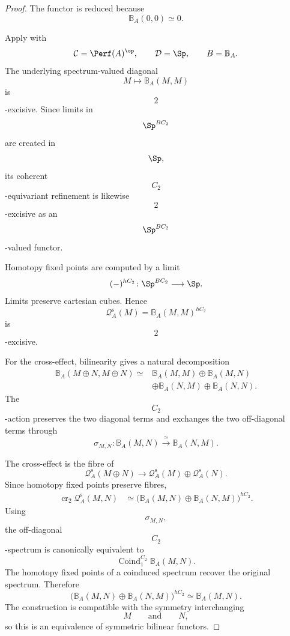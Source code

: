 \begin{proof}
The functor is reduced because
\[
    \mathbb B_A(0,0)
    \simeq
    0.
\]

Apply
with
\[
    \mathcal C
    =
    \Perf(A)^{\op},
    \qquad
    \mathcal D
    =
    \Sp,
    \qquad
    B
    =
    \mathbb B_A.
\]
The underlying spectrum-valued diagonal
\[
    M
    \longmapsto
    \mathbb B_A(M,M)
\]
is
\[
    2
\]
-excisive. Since limits in
\[
    \Sp^{BC_2}
\]
are created in
\[
    \Sp,
\]
its coherent
\[
    C_2
\]
-equivariant refinement is likewise
\[
    2
\]
-excisive as an
\[
    \Sp^{BC_2}
\]
-valued functor.

Homotopy fixed points are computed by a limit
\[
    (-)^{hC_2}
    \colon
    \Sp^{BC_2}
    \longrightarrow
    \Sp.
\]
Limits preserve cartesian cubes. Hence
\[
    \mathcal Q_A^{\mathrm s}(M)
    =
    \mathbb B_A(M,M)^{hC_2}
\]
is
\[
    2
\]
-excisive.

For the cross-effect, bilinearity gives a natural decomposition
\[
\begin{aligned}
    \mathbb B_A(M\oplus N,M\oplus N)
    \simeq{}&
    \mathbb B_A(M,M)
    \oplus
    \mathbb B_A(M,N)
    \\
    &\oplus
    \mathbb B_A(N,M)
    \oplus
    \mathbb B_A(N,N).
\end{aligned}
\]
The
\[
    C_2
\]
-action preserves the two diagonal terms and exchanges the two
off-diagonal terms through
\[
    \sigma_{M,N}
    \colon
    \mathbb B_A(M,N)
    \xrightarrow{\;\simeq\;}
    \mathbb B_A(N,M).
\]

The cross-effect is the fibre of
\[
    \mathcal Q_A^{\mathrm s}(M\oplus N)
    \longrightarrow
    \mathcal Q_A^{\mathrm s}(M)
    \oplus
    \mathcal Q_A^{\mathrm s}(N).
\]
Since homotopy fixed points preserve fibres,
\[
\begin{aligned}
    \operatorname{cr}_2
    \mathcal Q_A^{\mathrm s}(M,N)
    &\simeq
    \bigl(
        \mathbb B_A(M,N)
        \oplus
        \mathbb B_A(N,M)
    \bigr)^{hC_2}.
\end{aligned}
\]
Using
\[
    \sigma_{M,N},
\]
the off-diagonal
\[
    C_2
\]
-spectrum is canonically equivalent to
\[
    \operatorname{Coind}_{1}^{C_2}
    \mathbb B_A(M,N).
\]
The homotopy fixed points of a coinduced spectrum recover the original
spectrum. Therefore
\[
    \bigl(
        \mathbb B_A(M,N)
        \oplus
        \mathbb B_A(N,M)
    \bigr)^{hC_2}
    \simeq
    \mathbb B_A(M,N).
\]
The construction is compatible with the symmetry interchanging
\[
    M
    \qquad\text{and}\qquad
    N,
\]
so this is an equivalence of symmetric bilinear functors.
\end{proof}



